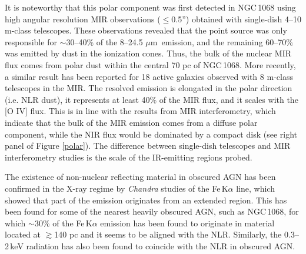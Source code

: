\documentclass{natureprintstyle}
\def\micron{$\mu$m}
\def\degr{$^o$}
\def\arcsec{''}
\begin{document}

 
It is noteworthy that this polar component was first detected in NGC\,1068 using high angular resolution MIR observations ($\le$0.5\arcsec) obtained with {single-dish 4--10 m-class telescopes\cite{Cameron93,Bock00,Mason06}. These observations revealed that
the point source was only responsible for $\sim$30--40\% of the 8--24.5 \micron~emission, and the remaining 60--70\% was emitted by dust in the ionization cones. Thus, the bulk of the nuclear MIR flux comes from polar dust within the central 70 pc of NGC\,1068\cite{Mason06}.} More recently, a similar result has been reported for 18 active galaxies observed with 8 m-class telescopes in the MIR\cite{Asmus16}. The resolved emission is
elongated in the polar direction (i.e. NLR dust), it represents at least 40\% of the MIR flux, and it scales with the [O IV] flux. This is in line with the results from MIR interferometry\cite{Honig12,Honig13}, which indicate that the bulk of the MIR emission comes from a diffuse polar component, while the NIR flux would be dominated by a compact disk (see right panel of Figure \ref{polar}). The difference between single-dish telescopes and MIR interferometry studies is the scale of the IR-emitting regions probed.

{The existence of non-nuclear reflecting material in obscured AGN has been confirmed in the X-ray regime by {\it Chandra} studies of the Fe\,K$\alpha$ line, which showed that part of the emission originates from an extended region.} This has been found for some of the nearest heavily obscured AGN, such as NGC\,1068\cite{Young:2001jw}, for which $\sim$30\% of the Fe\,K$\alpha$ emission has been found to originate in material located at $\gtrsim$140 pc\cite{Bauer:2015si} and it seems to be aligned with the NLR. {Similarly, the 0.3--2\,keV radiation has also been found to coincide with the NLR in obscured AGN\cite{Bianchi:2006kq}.}
\end{document}
